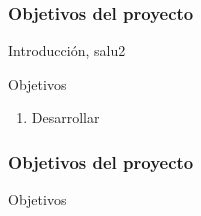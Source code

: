 \begin{frame}
    \frametitle{Objetivos del proyecto}
    Introducción, salu2
    \begin{block}{Objetivos}
        \begin{enumerate}
            \item Desarrollar 
        \end{enumerate}
    \end{block}

\end{frame}

\begin{frame}
    \frametitle{Objetivos del proyecto}
    \begin{block}{Objetivos}
     
    \end{block}

\end{frame}